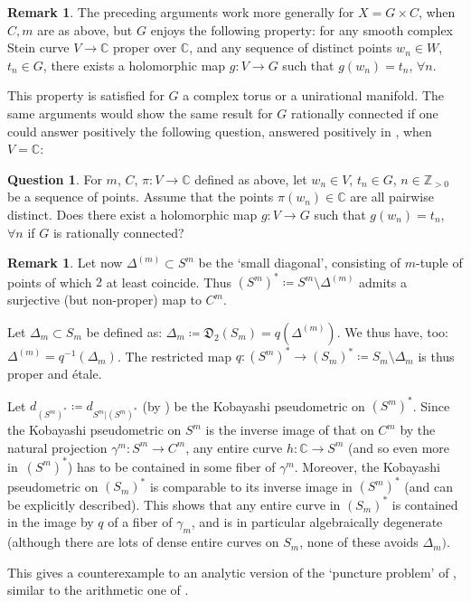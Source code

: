\documentclass[JEP,XML,SOM,Unicode, NoEqCountersInSection,NoFloatCountersInSection,published]{cedram}
\theoremstyle{theorem}
\theoremstyle{definition}
\newtheorem{question}{Question}
\newtheorem{remark}[proposition]{Remark}
\def\bC{{\mathbb C}}
\def\bZ{{\mathbb Z}}
\begin{document}
\begin{remark} The preceding arguments work more generally for $X=G\times C$, when $C,m$ are as above, but $G$ enjoys the following property: for any smooth complex Stein curve $V\to \bC$ proper over $\bC$, and any sequence of distinct points $w_n\in W$, $t_n\in G$, there exists a holomorphic map $g:V\to G$ such that $g(w_n)=t_n$, $\forall n$.

This property is satisfied for $G$ a complex torus or a unirational manifold. The same arguments would show the same result for $G$ rationally connected if one could answer positively the following question, answered positively in \cite{CW}, when $V=\bC$:

\begin{question}
For $m$, $C$, $\pi:V\to \bC$ defined as above, let $w_n\in V$, $t_n\in G$, $n\in \bZ_{>0}$ be a sequence of points. Assume that the points $\pi(w_n)\in \bC$ are all pairwise distinct. Does there exist a holomorphic map $g:V\to G$ such that $g(w_n)=t_n$, $\forall n$ if $G$ is rationally connected?
\end{question}
\end{remark}

\begin{remark}\label{rem:5.2}
Let now $\Delta^{(m)}\subset S^m$ be the `small diagonal', consisting of $m$-tuple of points of which $2$ at least coincide.
Thus $(S^m)^*\coloneqq S^m\setminus \Delta^{(m)}$ admits a surjective (but non-proper) map to $C^m$.

Let $\Delta_m\subset S_m$ be defined as: $\Delta_m\coloneqq  \mathfrak{D}_2(S_m) = q(\Delta^{(m)})$. We thus have, too: $\Delta^{(m)}=q^{-1}(\Delta_m)$.
The restricted map $q : (S^m)^*\to (S_m)^*\coloneqq S_m\setminus \Delta_m$ is thus proper and étale.

Let $d_{(S^m)^*}\coloneqq d_{S^m\vert (S^m)^*}$ (by \cite{Kobayashi}) be the Kobayashi pseudometric on $(S^m)^*$. Since the Kobayashi pseudometric on
$S^m$ is the inverse image of that on $C^m$ by the natural projection $\gamma^m:S^m\to C^m$, any entire curve $h:\bC \to S^m$ (and so even more in~$(S^m)^*$) has to be contained in some fiber of $\gamma^m$.
Moreover, the Kobayashi pseudometric on $(S_m)^*$ is comparable to its inverse image in $(S^m)^*$ (and can be explicitly described).
This shows that any entire curve in $(S_m)^*$ is contained in the image by $q$ of a fiber of $\gamma_m$, and is in particular algebraically degenerate
(although there are lots of dense entire curves on $S_m$, none of these avoids $\Delta_m)$.

This gives a counterexample to an analytic version of the `puncture problem' of \cite{HT}, similar to the arithmetic one of \cite{L}.
\end{remark}
\end{document}
